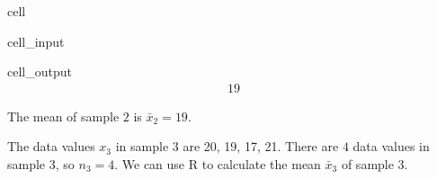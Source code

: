 \documentclass[letterpaper,10pt,english]{jupyterBook}
\begin{document}
\begin{sphinxuseclass}{cell}\begin{sphinxVerbatimInput}

\begin{sphinxuseclass}{cell_input}
\begin{sphinxVerbatim}[commandchars=\\\{\}]

\end{sphinxVerbatim}

\end{sphinxuseclass}\end{sphinxVerbatimInput}
\begin{sphinxVerbatimOutput}

\begin{sphinxuseclass}{cell_output}\begin{equation*}
\begin{split}19\end{split}
\end{equation*}
\end{sphinxuseclass}\end{sphinxVerbatimOutput}

\end{sphinxuseclass}
\sphinxAtStartPar
The mean of sample \(2\) is \(\bar{x}_2 = 19\).

\sphinxAtStartPar
The data values \(x_3\) in sample \(3\) are 20, 19, 17, 21. There are \(4\) data values in sample \(3\), so \(n_3 = 4\). We can use R to calculate the mean \(\bar{x}_3\) of sample \(3\).
\end{document}
